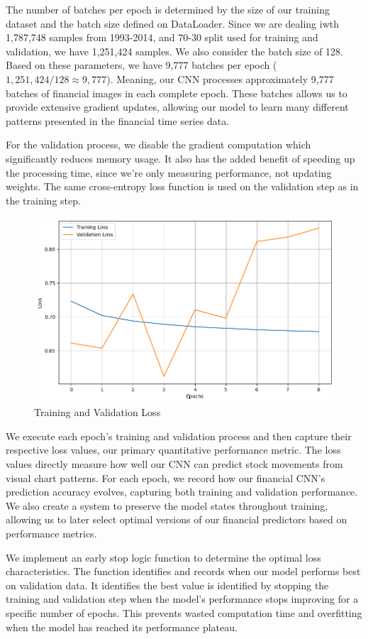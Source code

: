 \documentclass[12pt]{article}
\begin{document}
The number of batches per epoch is determined by the size of our training dataset and the batch size defined on DataLoader. Since we are dealing iwth 1,787,748 samples from 1993-2014, and 70-30 split used for training and validation, we have 1,251,424 samples. We also consider the batch size of 128. Based on these parameters, we have 9,777 batches per epoch ($1,251,424 / 128 \approx 9,777$). Meaning, our CNN processes approximately 9,777 batches of financial images in each complete epoch. These batches allows us to provide extensive gradient updates, allowing our model to learn many different patterns presented in the financial time series data.

For the validation process, we disable the gradient computation which significantly reduces memory usage. It also has the added benefit of speeding up the processing time, since we're only measuring performance, not updating weights. The same cross-entropy loss function is used on the validation step as in the training step.

\begin{figure}[h]
	\centering
	\includegraphics[width=.65\linewidth]{plots/training_validation.png}
	\caption{Training and Validation Loss}
	\label{fig:epoch_loss}
\end{figure}

We execute each epoch's training and validation process and then capture their respective loss values, our primary quantitative performance metric. The loss values directly measure how well our CNN can predict stock movements from visual chart patterns. For each epoch, we record how our financial CNN's prediction accuracy evolves, capturing both training and validation performance. We also create a system to preserve the model states throughout training, allowing us to later select optimal versions of our financial predictors based on performance metrics.

We implement an early stop logic function to determine the optimal loss characteristics. The function identifies and records when our model performs best on validation data. It identifies the best value is identified by stopping the training and validation step when the model's performance stops improving for a specific number of epochs. This prevents wasted computation time and overfitting when the model has reached its performance plateau.
\end{document}
